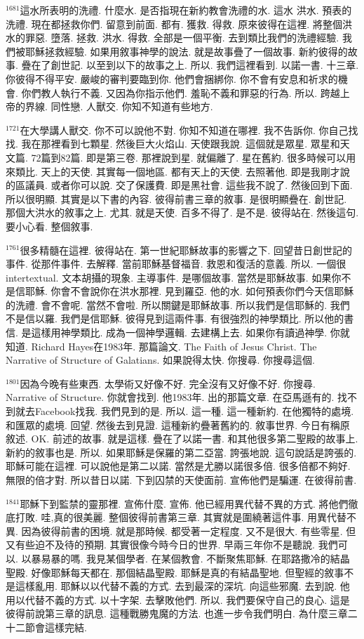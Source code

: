 \documentclass{book}
\begin{document}
$^{1681}$這水所表明的洗禮.
什麼水.
是否指現在新約教會洗禮的水.
這水 洪水.
預表的洗禮.
現在都拯救你們.
留意到前面.
都有.
獲救.
得救.
原來彼得在這裡.
將整個洪水的罪惡.
墮落.
拯救.
洪水.
得救.
全部是一個平衡.
去到類比我們的洗禮經驗.
我們被耶穌拯救經驗.
如果用敘事神學的說法.
就是故事疊了一個故事.
新約彼得的故事.
疊在了創世記.
以至到以下的故事之上.
所以.
我們這裡看到.
以諾一書.
十三章.
你彼得不得平安.
嚴峻的審判要臨到你.
他們會捆綁你.
你不會有安息和祈求的機會.
你們教人執行不義.
又因為你指示他們.
羞恥不義和罪惡的行為.
所以.
跨越上帝的界線.
同性戀.
人獸交.
你知不知道有些地方.

$^{1721}$在大學講人獸交.
你不可以說他不對.
你知不知道在哪裡.
我不告訴你.
你自己找找.
我在那裡看到七顆星.
然後巨大火焰山.
天使跟我說.
這個就是眾星.
眾星和天文篇.
72篇到82篇.
即是第三卷.
那裡說到星.
就偏離了.
星在舊約.
很多時候可以用來類比.
天上的天使.
其實每一個地區.
都有天上的天使.
去照著他.
即是我剛才說的區議員.
或者你可以說.
交了保護費.
即是黑社會.
這些我不說了.
然後回到下面.
所以很明顯.
其實是以下書的內容.
彼得前書三章的敘事.
是很明顯疊在.
創世記.
那個大洪水的敘事之上.
尤其.
就是天使.
百多不得了.
是不是.
彼得站在.
然後這句.
要小心看.
整個敘事.

$^{1761}$很多精髓在這裡.
彼得站在.
第一世紀耶穌故事的影響之下.
回望昔日創世記的事件.
從那件事件.
去解釋.
當前耶穌基督福音.
救恩和復活的意義.
所以.
一個很intertextual.
文本胡攝的現象.
主導事件.
是哪個故事.
當然是耶穌故事.
如果你不是信耶穌.
你會不會說你在洪水那裡.
見到羅亞.
他的水.
如何預表你們今天信耶穌的洗禮.
會不會呢.
當然不會啦.
所以關鍵是耶穌故事.
所以我們是信耶穌的.
我們不是信以羅.
我們是信耶穌.
彼得見到這兩件事.
有很強烈的神學類比.
所以他的書信.
是這樣用神學類比.
成為一個神學邏輯.
去建構上去.
如果你有讀過神學.
你就知道.
Richard Hayes在1983年.
那篇論文.
The Faith of Jesus Christ.
The Narrative of Structure of Galatians.
如果說得太快.
你搜尋.
你搜尋這個.

$^{1801}$因為今晚有些東西.
太學術又好像不好.
完全沒有又好像不好.
你搜尋.
Narrative of Structure.
你就會找到.
他1983年.
出的那篇文章.
在亞馬遜有的.
找不到就去Facebook找我.
我們見到的是.
所以.
這一種.
這一種新約.
在他獨特的處境.
和匯眾的處境.
回望.
然後去到見證.
這種新約疊著舊約的.
敘事世界.
今日有稱原敘述.
OK.
前述的故事.
就是這樣.
疊在了以諾一書.
和其他很多第二聖殿的故事上.
新約的敘事也是.
所以.
如果耶穌是保羅的第二亞當.
誇張地說.
這句說話是誇張的.
耶穌可能在這裡.
可以說他是第二以諾.
當然是尤勝以諾很多倍.
很多倍都不夠好.
無限的倍才對.
所以昔日以諾.
下到囚禁的天使面前.
宣佈他們是騙運.
在彼得前書.

$^{1841}$耶穌下到監禁的靈那裡.
宣佈什麼.
宣佈.
他已經用異代替不異的方式.
將他們徹底打敗.
哇,真的很美麗.
整個彼得前書第三章.
其實就是圍繞著這件事.
用異代替不異.
因為彼得前書的困境.
就是那時候.
都受著一定程度.
又不是很大.
有些零星.
但又有些迫不及待的預期.
其實很像今時今日的世界.
早兩三年你不是聽說.
我們可以.
以暴易暴的嗎.
我見某個學者.
在某個教會.
不斷聚焦耶穌.
在耶路撒冷的結晶聖殿.
好像耶穌每天都在.
那個結晶聖殿.
耶穌是真的有結晶聖地.
但聖經的敘事不是這樣亂用.
耶穌以以代替不義的方式.
去到最深的深坑.
向這些邪魔.
去到說.
他用以代替不義的方式.
以十字架.
去擊敗他們.
所以.
我們要保守自己的良心.
這是彼得前說第三章的訊息.
這種戰勝鬼魔的方法.
也進一步令我們明白.
為什麼三章二十二節會這樣完結.
\end{document}
